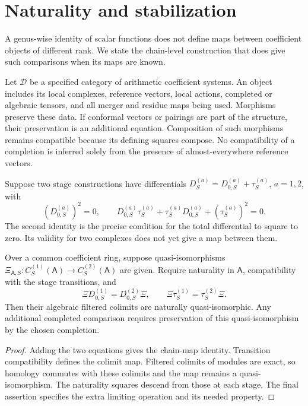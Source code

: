 \section{Naturality and stabilization}

A genus-wise identity of scalar functions does not define maps between
coefficient objects of different rank. We state the chain-level construction
that does give such comparisons when its maps are known.

Let $\mathcal D$ be a specified category of arithmetic coefficient systems.
An object includes its local complexes, reference vectors, local actions,
completed or algebraic tensors, and all merger and residue maps being used.
Morphisms preserve these data. If conformal vectors or pairings are part of
the structure, their preservation is an additional equation. Composition of
such morphisms remains compatible because its defining squares compose. No
compatibility of a completion is inferred solely from the presence of
almost-everywhere reference vectors.

Suppose two stage constructions have differentials
$D^{(a)}_S=D^{(a)}_{0,S}+\tau^{(a)}_S$, $a=1,2$, with
\[
 (D^{(a)}_{0,S})^2=0,\qquad
 D^{(a)}_{0,S}\tau^{(a)}_S+
 \tau^{(a)}_SD^{(a)}_{0,S}
       +(\tau^{(a)}_S)^2=0.
\]
The second identity is the precise condition for the total differential to
square to zero. Its validity for two complexes does not yet give a map
between them.

\begin{proposition}
\label{v4-arith:traces:stage-comparison}
Over a common coefficient ring, suppose quasi-isomorphisms $\Xi_{\mathsf
A,S}:C^{(1)}_S(\mathsf A) \to C^{(2)}_S(\mathsf A)$ are given. Require
naturality in $\mathsf A$, compatibility with the stage transitions, and
\[
 \Xi D^{(1)}_{0,S}=D^{(2)}_{0,S}\Xi,\qquad
 \Xi\tau^{(1)}_S=\tau^{(2)}_S\Xi.
\]
Then their algebraic filtered colimits are naturally quasi-isomorphic. Any
additional completed comparison requires preservation of this
quasi-isomorphism by the chosen completion.
\end{proposition}
\begin{proof}
Adding the two equations gives the chain-map identity. Transition
compatibility defines the colimit map. Filtered colimits of modules are
exact, so homology commutes with these colimits and the map remains a
quasi-isomorphism. The naturality squares descend from those at each stage.
The final assertion specifies the extra limiting operation and its needed
property.
\end{proof}

